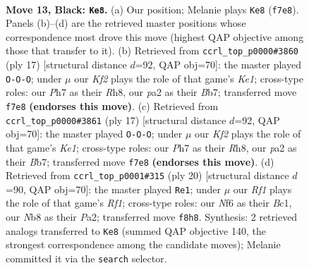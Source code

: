 \documentclass[11pt]{article}
\begin{document}
\clearpage

\begin{figure}[p]\centering
\begin{subfigure}{0.46\textwidth}\centering
\resizebox{\linewidth}{!}{%
\newchessgame
\chessboard[
  setfen={rnb2r2/p3bkpp/1ppq1n2/3p1p2/3P3P/1P2PNPB/P3QP2/RNB1R1K1 b - - 2 13},
  showmover=false,
  pgfstyle=straightmove, color=movearrow, markmove={f7-e8}
]}
\caption{}
\end{subfigure}\hfill
\begin{subfigure}{0.46\textwidth}\centering
\resizebox{\linewidth}{!}{%
\newchessgame
\chessboard[
  setfen={r3kb1r/pbpqnppp/1pn1p3/4P3/2BP4/P1N1BN2/1P3PPP/R2QK2R b KQkq - 0 9},
  showmover=false,
  pgfstyle=straightmove, color=movearrow, markmove={e8-c8}
]}
\caption{}
\end{subfigure}
\\[4pt]
\begin{subfigure}{0.46\textwidth}\centering
\resizebox{\linewidth}{!}{%
\newchessgame
\chessboard[
  setfen={r3kb1r/pbpqnppp/1pn1p3/4P3/2BP4/P1N1BN2/1P3PPP/R2QK2R b KQkq - 0 9},
  showmover=false,
  pgfstyle=straightmove, color=movearrow, markmove={e8-c8}
]}
\caption{}
\end{subfigure}\hfill
\begin{subfigure}{0.46\textwidth}\centering
\resizebox{\linewidth}{!}{%
\newchessgame
\chessboard[
  setfen={rnbq1rk1/4ppbp/2pp1np1/p7/2QP4/2N2NPP/PP2PPB1/R1B2RK1 w - - 0 11},
  showmover=false,
  pgfstyle=straightmove, color=movearrow, markmove={f1-e1}
]}
\caption{}
\end{subfigure}
\caption{\textbf{Move 13, Black: \texttt{Ke8}.} (a) Our position; Melanie plays \texttt{Ke8} (\texttt{f7e8}). Panels (b)--(d) are the retrieved master positions whose correspondence most drove this move (highest QAP objective among those that transfer to it). (b) Retrieved from \texttt{ccrl\_top\_p0000\#3860} (ply 17) [structural distance $d$=92, QAP obj=70]: the master played \texttt{O-O-O}; under $\mu$ our \emph{Kf2} plays the role of that game's \emph{Ke1}; cross-type roles: our \emph{P}h7 as their \emph{R}h8, our \emph{p}a2 as their \emph{B}b7; transferred move \texttt{f7e8} \textbf{(endorses this move)}. (c) Retrieved from \texttt{ccrl\_top\_p0000\#3861} (ply 17) [structural distance $d$=92, QAP obj=70]: the master played \texttt{O-O-O}; under $\mu$ our \emph{Kf2} plays the role of that game's \emph{Ke1}; cross-type roles: our \emph{P}h7 as their \emph{R}h8, our \emph{p}a2 as their \emph{B}b7; transferred move \texttt{f7e8} \textbf{(endorses this move)}. (d) Retrieved from \texttt{ccrl\_top\_p0001\#315} (ply 20) [structural distance $d$=90, QAP obj=70]: the master played \texttt{Re1}; under $\mu$ our \emph{Rf1} plays the role of that game's \emph{Rf1}; cross-type roles: our \emph{N}f6 as their \emph{B}c1, our \emph{N}b8 as their \emph{P}a2; transferred move \texttt{f8h8}. Synthesis: 2 retrieved analogs transferred to \texttt{Ke8} (summed QAP objective 140, the strongest correspondence among the candidate moves); Melanie committed it via the \texttt{search} selector.}
\label{fig:thought-m25}
\end{figure}
\end{document}
